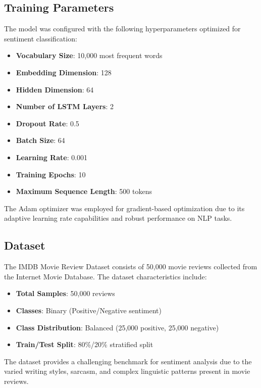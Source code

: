 \documentclass[a4paper, journal]{IEEEtran}
\begin{document}
\subsection{Training Parameters}

The model was configured with the following hyperparameters optimized for sentiment classification:

\begin{itemize}
    \item \textbf{Vocabulary Size}: 10,000 most frequent words
    \item \textbf{Embedding Dimension}: 128
    \item \textbf{Hidden Dimension}: 64
    \item \textbf{Number of LSTM Layers}: 2
    \item \textbf{Dropout Rate}: 0.5
    \item \textbf{Batch Size}: 64
    \item \textbf{Learning Rate}: 0.001
    \item \textbf{Training Epochs}: 10
    \item \textbf{Maximum Sequence Length}: 500 tokens
\end{itemize}

The Adam optimizer was employed for gradient-based optimization due to its adaptive learning rate capabilities and robust performance on NLP tasks.

\subsection{Dataset}

The IMDB Movie Review Dataset consists of 50,000 movie reviews collected from the Internet Movie Database. The dataset characteristics include:

\begin{itemize}
    \item \textbf{Total Samples}: 50,000 reviews
    \item \textbf{Classes}: Binary (Positive/Negative sentiment)
    \item \textbf{Class Distribution}: Balanced (25,000 positive, 25,000 negative)
    \item \textbf{Train/Test Split}: 80\%/20\% stratified split
\end{itemize}

The dataset provides a challenging benchmark for sentiment analysis due to the varied writing styles, sarcasm, and complex linguistic patterns present in movie reviews.
\end{document}
